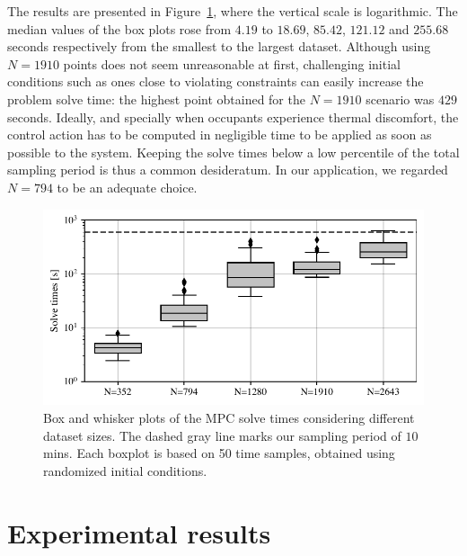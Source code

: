 The results are presented in Figure~\ref{fig.runTimes}, where the vertical scale is logarithmic. The median values of the box plots rose from $4.19$ to $18.69$, $85.42$, $121.12$ and $255.68$ seconds respectively from the smallest to the largest dataset. Although using $N=1910$ points does not seem unreasonable at first, challenging initial conditions such as ones close to violating constraints can easily increase the problem solve time: the highest point obtained for the $N=1910$ scenario was $429$ seconds. Ideally, and specially when occupants experience thermal discomfort, the control action has to be computed in negligible time to be applied as soon as possible to the system. Keeping the solve times below a low percentile of the total sampling period is thus a common desideratum. In our application, we regarded $N=794$ to be an adequate choice.

\begin{figure}[!t]
	\centering
	\includegraphics[scale=0.67]{../images/chap3_warm_start.pdf} \hspace{6pt}
	\caption{Box and whisker plots of the MPC solve times considering different dataset sizes. The dashed gray line marks our sampling period of $10\,$mins. Each boxplot is based on 50 time samples, obtained using randomized initial conditions.}
	\label{fig.runTimes}
\end{figure}

\section{Experimental results}

